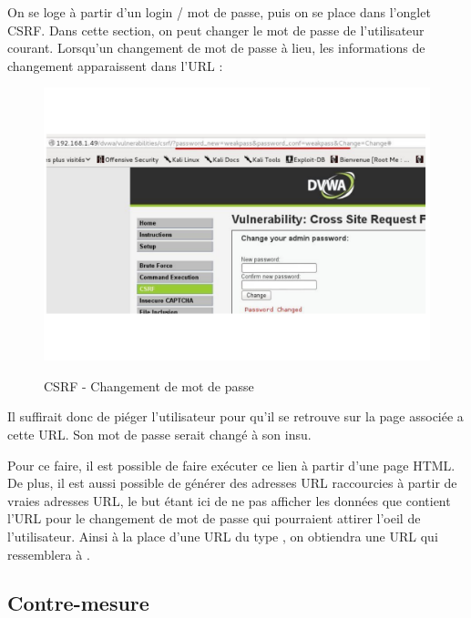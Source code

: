 On se loge à partir d'un login / mot de passe, puis on se place dans l'onglet CSRF. Dans cette section, on peut changer le mot de passe de l'utilisateur courant. Lorsqu'un changement de mot de passe à lieu, les informations de changement apparaissent dans l'URL : 

\begin{figure}[!h]
\begin{center}

\label{inclusion}
\includegraphics[scale=0.5]{images/CSRF-ChangementMotDePasse.pdf}

\caption{CSRF - Changement de mot de passe}

\end{center}
\end{figure}

Il suffirait donc de piéger l'utilisateur pour qu'il se retrouve sur la page associée a cette URL. Son mot de passe serait changé à son insu.

Pour ce faire, il est possible de faire exécuter ce lien à partir d'une page HTML. De plus, il est aussi possible de générer des adresses URL raccourcies à partir de vraies adresses URL, le but étant ici de ne pas afficher les données que contient l'URL pour le changement de mot de passe qui pourraient attirer l'oeil de l'utilisateur. Ainsi à la place d'une URL du type , on obtiendra une URL qui ressemblera à .

\subsection{Contre-mesure}


